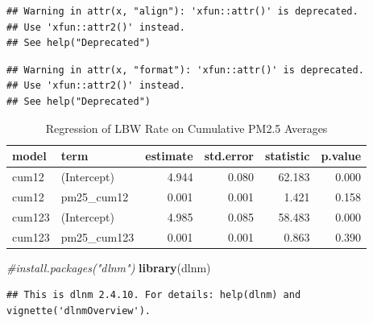 \documentclass[
]{article}
\newenvironment{Shaded}{\begin{snugshade}}{\end{snugshade}}
\newcommand{\CommentTok}[1]{\textcolor[rgb]{0.56,0.35,0.01}{\textit{#1}}}
\newcommand{\FunctionTok}[1]{\textcolor[rgb]{0.13,0.29,0.53}{\textbf{#1}}}
\newcommand{\NormalTok}[1]{#1}
\begin{document}
\begin{verbatim}
## Warning in attr(x, "align"): 'xfun::attr()' is deprecated.
## Use 'xfun::attr2()' instead.
## See help("Deprecated")
\end{verbatim}

\begin{verbatim}
## Warning in attr(x, "format"): 'xfun::attr()' is deprecated.
## Use 'xfun::attr2()' instead.
## See help("Deprecated")
\end{verbatim}

\begin{longtable}[t]{llrrrr}
\caption{\label{tab:unnamed-chunk-4}Regression of LBW Rate on Cumulative PM2.5 Averages}\\
\toprule
model & term & estimate & std.error & statistic & p.value\\
\midrule
cum12 & (Intercept) & 4.944 & 0.080 & 62.183 & 0.000\\
cum12 & pm25\_cum12 & 0.001 & 0.001 & 1.421 & 0.158\\
cum123 & (Intercept) & 4.985 & 0.085 & 58.483 & 0.000\\
cum123 & pm25\_cum123 & 0.001 & 0.001 & 0.863 & 0.390\\
\bottomrule
\end{longtable}

\begin{Shaded}
\begin{Highlighting}[]
\CommentTok{\#install.packages("dlnm")}
\FunctionTok{library}\NormalTok{(dlnm)}
\end{Highlighting}
\end{Shaded}

\begin{verbatim}
## This is dlnm 2.4.10. For details: help(dlnm) and vignette('dlnmOverview').
\end{verbatim}
\end{document}
